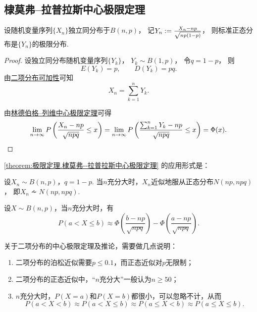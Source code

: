 \subsection{棣莫弗--拉普拉斯中心极限定理}
\begin{theorem}\label{theorem:极限定理.棣莫弗--拉普拉斯中心极限定理}
设随机变量序列\(\{X_n\}\)独立同分布于\(B(n,p)\)，
记\(
	Y_n
	:=
	\frac{X_n - np}{\sqrt{np(1-p)}}
\)，
则标准正态分布是\(\{Y_n\}\)的极限分布.
\begin{proof}
设独立同分布随机变量序列\(\{Y_k\}\)，
\(Y_k \sim B(1,p)\)，
令\(q=1-p\)，
则\begin{equation*}
	E(Y_k)=p,
	\qquad
	D(Y_k)=pq.
\end{equation*}
由\hyperref[theorem:多维随机变量及其分布.二项分布的可加性3]{二项分布可加性}可知\begin{equation*}
	X_n = \sum_{k=1}^n Y_k.
\end{equation*}

由\hyperref[theorem:极限定理.林德伯格--列维中心极限定理]{林德伯格--列维中心极限定理}可得\begin{equation*}
	\lim_{n\to\infty} P\left(\frac{X_n-np}{\sqrt{npq}} \leq x\right)
	= \lim_{n\to\infty} P\left(\frac{\sum_{k=1}^n{Y_k}-np}{\sqrt{npq}} \leq x\right)
	= \Phi(x).
	\qedhere
\end{equation*}
\end{proof}
\end{theorem}

\cref{theorem:极限定理.棣莫弗--拉普拉斯中心极限定理} 的应用形式是：
\begin{corollary}
设\(X_n \sim B(n,p)\)，\(q = 1-p\).
当\(n\)充分大时，\(X_n\)近似地服从正态分布\(N(np,npq)\)，
即\(
	X_n \dotsim N(np,npq)
\).
\end{corollary}

\begin{corollary}
设\(X \sim B(n,p)\)，当\(n\)充分大时，有\begin{equation*}
	P(a < X \leq b)
	\approx
	\Phi\left(\frac{b-np}{\sqrt{npq}}\right)
	- \Phi\left(\frac{a-np}{\sqrt{npq}}\right).
\end{equation*}
\end{corollary}

关于二项分布的中心极限定理及推论，需要做几点说明：
\begin{enumerate}
	\item 二项分布的泊松近似需要\(p \leq 0.1\)，而正态近似对\(p\)无限制；
	\item 二项分布的正态近似中，“\(n\)充分大”一般认为\(n \geq 50\)；
	\item \(n\)充分大时，\(P(X=a)\)和\(P(X=b)\)都很小，可以忽略不计，从而\begin{equation*}
		P(a < X < b)
		\approx P(a < X \leq b)
		\approx P(a \leq X < b)
		\approx P(a \leq X \leq b).
	\end{equation*}
\end{enumerate}

